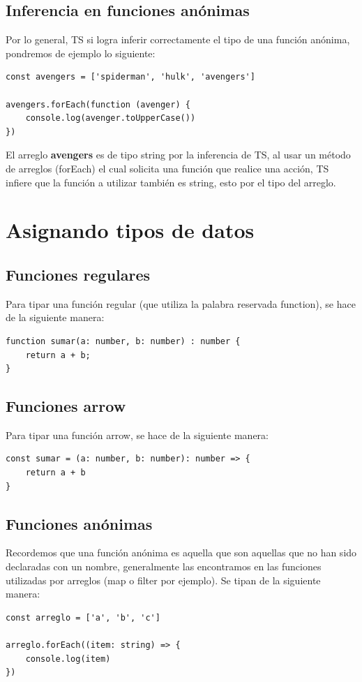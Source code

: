 \subsection{Inferencia en funciones anónimas}

Por lo general, TS si logra inferir correctamente el tipo de una función anónima, pondremos de ejemplo lo siguiente:
\begin{lstlisting}
const avengers = ['spiderman', 'hulk', 'avengers']

avengers.forEach(function (avenger) {
    console.log(avenger.toUpperCase())
})    
\end{lstlisting}

El arreglo \textbf{avengers} es de tipo string por la inferencia de TS, al usar un método de arreglos (forEach) el cual solicita una función que realice una acción, TS infiere que la función a utilizar también es string, esto por el tipo del arreglo.



\section{Asignando tipos de datos}


\subsection{Funciones regulares}

Para tipar una función regular (que utiliza la palabra reservada function), se hace de la siguiente manera:
\begin{lstlisting}
function sumar(a: number, b: number) : number {
    return a + b;
}
\end{lstlisting}


\subsection{Funciones arrow}

Para tipar una función arrow, se hace de la siguiente manera:
\begin{lstlisting}
const sumar = (a: number, b: number): number => {
    return a + b
}
\end{lstlisting}


\subsection{Funciones anónimas}

Recordemos que una función anónima es aquella que son aquellas que no han sido declaradas con un nombre, generalmente las encontramos en las funciones utilizadas por arreglos (map o filter por ejemplo). Se tipan de la siguiente manera:
\begin{lstlisting}
const arreglo = ['a', 'b', 'c']

arreglo.forEach((item: string) => {
    console.log(item)
})
\end{lstlisting}


